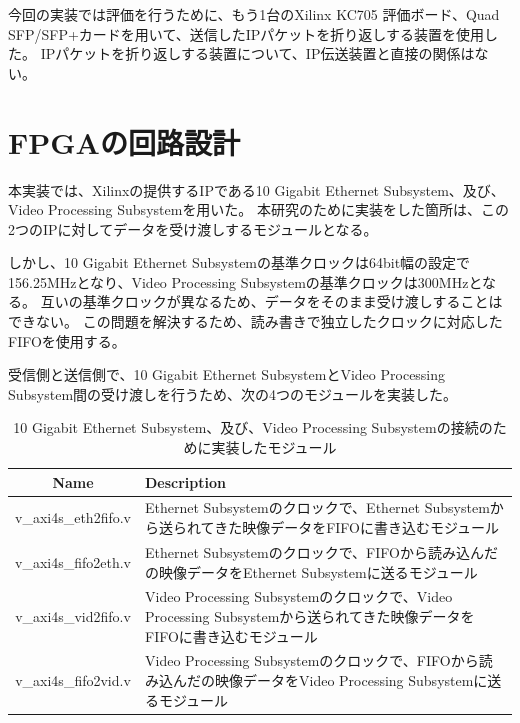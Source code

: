 今回の実装では評価を行うために、もう1台のXilinx KC705 評価ボード、Quad SFP/SFP+カードを用いて、送信したIPパケットを折り返しする装置を使用した。
IPパケットを折り返しする装置について、IP伝送装置と直接の関係はない。

\section{FPGAの回路設計}

本実装では、Xilinxの提供するIPである10 Gigabit Ethernet Subsystem\cite{xilinx-pg157}、及び、Video Processing Subsystem\cite{xilinx-pg230}を用いた。
本研究のために実装をした箇所は、この2つのIPに対してデータを受け渡しするモジュールとなる。

しかし、10 Gigabit Ethernet Subsystemの基準クロックは64bit幅の設定で156.25MHzとなり、Video Processing Subsystemの基準クロックは300MHzとなる。
互いの基準クロックが異なるため、データをそのまま受け渡しすることはできない。
この問題を解決するため、読み書きで独立したクロックに対応したFIFOを使用する。

受信側と送信側で、10 Gigabit Ethernet SubsystemとVideo Processing Subsystem間の受け渡しを行うため、次の4つのモジュールを実装した。

\begin{table}[htbp]
  \caption{10 Gigabit Ethernet Subsystem、及び、Video Processing Subsystemの接続のために実装したモジュール}
  \label{tb:fpga-implement-modules}
  \begin{center}
  \begin{tabular}{c|p{12cm}}
    \hline
    Name               & Description \\\hline\hline
    v\_axi4s\_eth2fifo.v & Ethernet Subsystemのクロックで、Ethernet Subsystemから送られてきた映像データをFIFOに書き込むモジュール \\\hline
    v\_axi4s\_fifo2eth.v & Ethernet Subsystemのクロックで、FIFOから読み込んだの映像データをEthernet Subsystemに送るモジュール \\\hline
    v\_axi4s\_vid2fifo.v & Video Processing Subsystemのクロックで、Video Processing Subsystemから送られてきた映像データをFIFOに書き込むモジュール \\\hline
    v\_axi4s\_fifo2vid.v & Video Processing Subsystemのクロックで、FIFOから読み込んだの映像データをVideo Processing Subsystemに送るモジュール \\\hline
  \end{tabular}\end{center}
\end{table}

